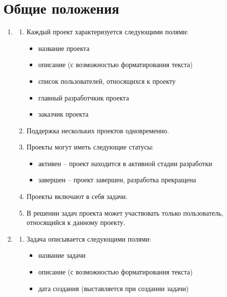\documentclass[14pt,a4paper]{extarticle}
\begin{document}
	
	\section {Общие положения}
	\begin{enumerate}
		\item {}
		\begin{enumerate}
			\item Каждый проект характеризуется следующими полями:
			\begin{itemize}
				\item название проекта
				\item описание (с возможностью форматирования текста)
				\item список пользователей, относящихся к проекту
				\item главный разработчкик проекта
				\item заказчик проекта
			\end{itemize}
			
			\item Поддержка нескольких проектов одновременно.
			
			\item Проекты могут иметь следующие статусы:
			\begin{itemize}
				\item активен -- проект находится в активной стадии разработки
				\item завершен -- проект завершен, разработка прекращена
			\end{itemize}
			
			\item Проекты включают в себя задачи.
			
			\item В решении задач проекта может участвовать только пользователь, относящийся к данному проекту.
			
		\end{enumerate}
		
		\item {}
		\begin{enumerate}
			\item Задача описывается следующими полями:
			\begin{itemize}
				\item название задачи
				
				\item описание (с возможностью форматирования текста)
				
				\item дата создания (выставляется {} при создании задачи)
				

\end{itemize}
\end{enumerate}
\end{enumerate}
\end{document}
